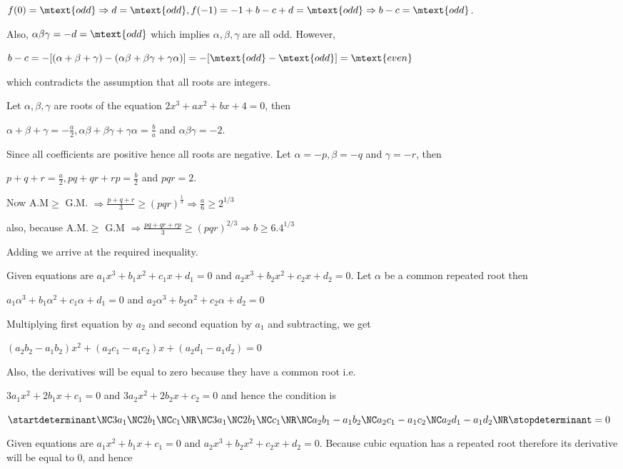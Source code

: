   $f(0) = \mtext{odd} \Rightarrow d = \mtext{odd}, f(-1) = -1 + b - c + d = \mtext{odd} \Rightarrow b - c =
  \mtext{odd}$.

  Also, $\alpha\beta\gamma = -d = \mtext{odd}$ which implies $\alpha, \beta, \gamma$ are all odd. However,

  $b - c = -[(\alpha + \beta + \gamma) - (\alpha\beta + \beta\gamma + \gamma\alpha)] = -[\mtext{odd} -
    \mtext{odd}] = \mtext{even}$

  which contradicts the assumption that all roots are integers.
\item Let $\alpha, \beta, \gamma$ are roots of the equation $2x^3 + ax^2 + bx + 4 = 0$, then

  $\alpha + \beta + \gamma = -\frac{a}{2}, \alpha\beta + \beta\gamma + \gamma\alpha = \frac{b}{a}$ and
  $\alpha\beta\gamma = -2$.

  Since all coefficients are positive hence all roots are negative. Let $\alpha = -p, \beta = -q$ and
  $\gamma = -r$, then

  $p + q + r = \frac{a}{2}, pq + qr + rp = \frac{b}{2}$ and $pqr = 2$.

  Now A.M$\geq$ G.M. $\Rightarrow \frac{p + q + r}{3}\geq (pqr)^{\frac{1}{3}}\Rightarrow \frac{a}{6}\geq
  2^{1/3}$

  also, because A.M.$\geq$ G.M $\Rightarrow \frac{pq + qr + rp}{3}\geq (pqr)^{2/3} \Rightarrow b\geq
  6.4^{1/3}$

  Adding we arrive at the required inequality.
\item Given equations are $a_1x^3 + b_1x^2 + c_1x + d_1 = 0$ and $a_2x^3 + b_2x^2 + c_2x + d_2 = 0$. Let
  $\alpha$ be a common repeated root then

  $a_1\alpha^3 + b_1\alpha^2 + c_1\alpha + d_1 = 0$ and $a_2\alpha^3 + b_2\alpha^2 + c_2\alpha + d_2 = 0$

  Multiplying first equation by $a_2$ and second equation by $a_1$ and subtracting, we get

  $(a_2b_2 - a_1b_2)x^2 + (a_2c_1 - a_1c_2)x + (a_2d_1 - a_1d_2) = 0$

  Also, the derivatives will be equal to zero because they have a common root i.e.

  $3a_1x^2 + 2b_1x + c_1 = 0$ and $3a_2x^2 + 2b_2x + c_2 = 0$ and hence the condition is

  $\startdeterminant\NC 3a_1\NC 2b_1\NC c_1\NR\NC 3a_1\NC 2b_1\NC c_1\NR\NC a_2b_1 - a_1b_2\NC a_2c_1 -
  a_1c_2\NC a_2d_1 - a_1d_2\NR\stopdeterminant = 0$
\item Given equations are $a_1x^2 + b_1x + c_1 = 0$ and $a_2x^3 + b_2x^2 + c_2x + d_2 = 0$. Because cubic
  equation has a repeated root therefore its derivative will be equal to $0$, and hence

